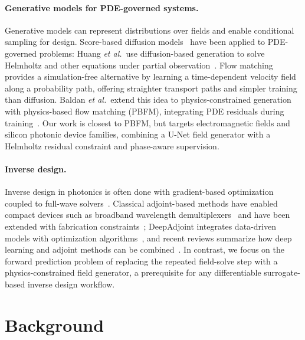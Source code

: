 \documentclass[%
 reprint,
 amsmath,amssymb,
 aps,
floatfix,
]{revtex4-2}
\begin{document}
\paragraph{Generative models for PDE-governed systems.}
Generative models can represent distributions over fields and enable conditional sampling for design. Score-based diffusion models~\cite{Song2021ScoreSDE} have been applied to PDE-governed problems: Huang \emph{et al.}\ use diffusion-based generation to solve Helmholtz and other equations under partial observation~\cite{Huang2024DiffusionPDE}. Flow matching~\cite{Lipman2023FlowMatching} provides a simulation-free alternative by learning a time-dependent velocity field along a probability path, offering straighter transport paths and simpler training than diffusion. Baldan \emph{et al.}\ extend this idea to physics-constrained generation with physics-based flow matching (PBFM), integrating PDE residuals during training~\cite{Baldan2025PBFM}. Our work is closest to PBFM, but targets electromagnetic fields and silicon photonic device families, combining a U-Net field generator with a Helmholtz residual constraint and phase-aware supervision.

\paragraph{Inverse design.}
Inverse design in photonics is often done with gradient-based optimization coupled to full-wave solvers~\cite{Molesky2018InverseDesign}. Classical adjoint-based methods have enabled compact devices such as broadband wavelength demultiplexers~\cite{Piggott2015DemultiplexerNatPhoton} and have been extended with fabrication constraints~\cite{Piggott2017FabricationConstrainedSciRep}; DeepAdjoint integrates data-driven models with optimization algorithms~\cite{Yeung2023DeepAdjoint}, and recent reviews summarize how deep learning and adjoint methods can be combined~\cite{Pan2023PhotonicsReview}. In contrast, we focus on the forward prediction problem of replacing the repeated field-solve step with a physics-constrained field generator, a prerequisite for any differentiable surrogate-based inverse design workflow.


\section{\label{sec:level3}Background}
\end{document}
